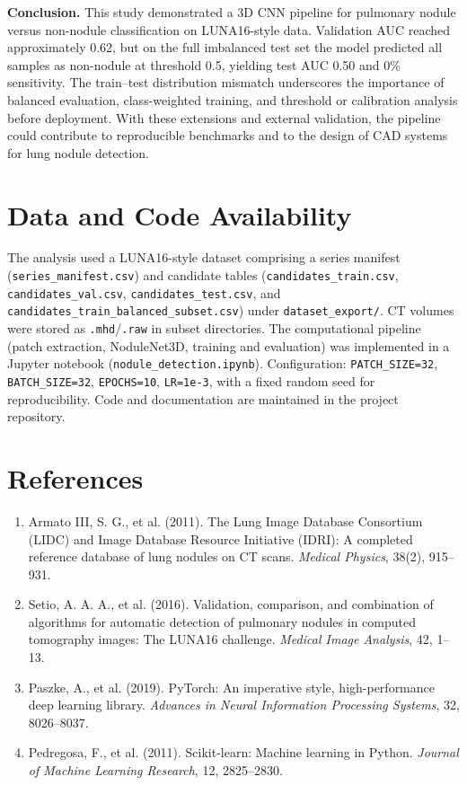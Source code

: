 \documentclass[11pt,a4paper]{article}
\begin{document}
\textbf{Conclusion.} This study demonstrated a 3D CNN pipeline for pulmonary nodule versus non-nodule classification on LUNA16-style data. Validation AUC reached approximately 0.62, but on the full imbalanced test set the model predicted all samples as non-nodule at threshold 0.5, yielding test AUC 0.50 and 0\% sensitivity. The train--test distribution mismatch underscores the importance of balanced evaluation, class-weighted training, and threshold or calibration analysis before deployment. With these extensions and external validation, the pipeline could contribute to reproducible benchmarks and to the design of CAD systems for lung nodule detection.

\section{Data and Code Availability}

The analysis used a LUNA16-style dataset comprising a series manifest (\texttt{series\_manifest.csv}) and candidate tables (\texttt{candidates\_train.csv}, \texttt{candidates\_val.csv}, \texttt{candidates\_test.csv}, and \texttt{candidates\_train\_balanced\_subset.csv}) under \texttt{dataset\_export/}. CT volumes were stored as \texttt{.mhd}/\texttt{.raw} in subset directories. The computational pipeline (patch extraction, NoduleNet3D, training and evaluation) was implemented in a Jupyter notebook (\texttt{nodule\_detection.ipynb}). Configuration: \texttt{PATCH\_SIZE=32}, \texttt{BATCH\_SIZE=32}, \texttt{EPOCHS=10}, \texttt{LR=1e-3}, with a fixed random seed for reproducibility. Code and documentation are maintained in the project repository.

\section*{References}

\begin{enumerate}
\item Armato III, S. G., et al. (2011). The Lung Image Database Consortium (LIDC) and Image Database Resource Initiative (IDRI): A completed reference database of lung nodules on CT scans. \textit{Medical Physics}, 38(2), 915--931.
\item Setio, A. A. A., et al. (2016). Validation, comparison, and combination of algorithms for automatic detection of pulmonary nodules in computed tomography images: The LUNA16 challenge. \textit{Medical Image Analysis}, 42, 1--13.
\item Paszke, A., et al. (2019). PyTorch: An imperative style, high-performance deep learning library. \textit{Advances in Neural Information Processing Systems}, 32, 8026--8037.
\item Pedregosa, F., et al. (2011). Scikit-learn: Machine learning in Python. \textit{Journal of Machine Learning Research}, 12, 2825--2830.
\end{enumerate}
\end{document}
